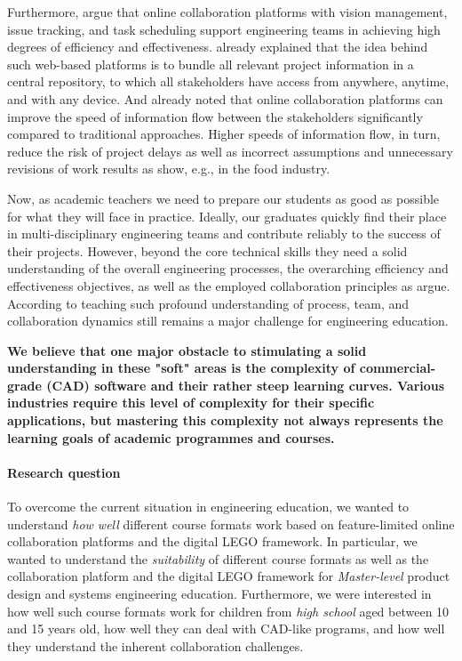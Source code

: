 \documentclass{PDS}
\begin{document}
Furthermore, \citet{Hackenberg_2023} argue that online collaboration platforms with vision management, issue tracking, and task scheduling support engineering teams in achieving high degrees of efficiency and effectiveness.
\citet{Tony_Liu_2001} already explained that the idea behind such web-based platforms is to bundle all relevant project information in a central repository, to which all stakeholders have access from anywhere, anytime, and with any device.
And \citet{Kraemer_1988} already noted that online collaboration platforms can improve the speed of information flow between the stakeholders significantly compared to traditional approaches.
Higher speeds of information flow, in turn, reduce the risk of project delays as well as incorrect assumptions and unnecessary revisions of work results as \citet{Novak_2009} show, e.g., in the food industry.

Now, as academic teachers we need to prepare our students as good as possible for what they will face in practice.
Ideally, our graduates quickly find their place in multi-disciplinary engineering teams and contribute reliably to the success of their projects.
However, beyond the core technical skills they need a solid understanding of the overall engineering processes, the overarching efficiency and effectiveness objectives, as well as the employed collaboration principles as \citet{Deshpande_2011} argue.
According to \citet{Meyer_2020} teaching such profound understanding of process, team, and collaboration dynamics still remains a major challenge for engineering education.

\textbf{We believe that one major obstacle to stimulating a solid understanding in these "soft" areas is the complexity of commercial-grade (CAD) software and their rather steep learning curves. Various industries require this level of complexity for their specific applications, but mastering this complexity not always represents the learning goals of academic programmes and courses.}

\paragraph{Research question}

To overcome the current situation in engineering education, we wanted to understand \textit{how well} different course formats work based on feature-limited online collaboration platforms and the digital LEGO framework.
In particular, we wanted to understand the \textit{suitability} of different course formats as well as the collaboration platform and the digital LEGO framework for \textit{Master-level} product design and systems engineering education.
Furthermore, we were interested in how well such course formats work for children from \textit{high school} aged between 10 and 15 years old, how well they can deal with CAD-like programs, and how well they understand the inherent collaboration challenges.
\end{document}
